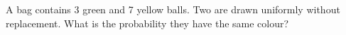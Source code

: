 A bag contains 3 green and 7 yellow balls. Two are drawn uniformly without replacement. What is the probability they have the same colour?
